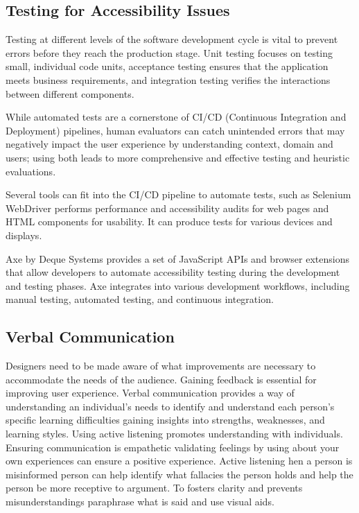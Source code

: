 \documentclass[main.tex]{subfiles}
\begin{document}
\subsection{Testing for Accessibility Issues}

Testing at different levels of the software development cycle is vital to prevent errors before they reach the production stage. Unit testing focuses on testing small, individual code units, acceptance testing ensures that the application meets business requirements, and integration testing verifies the interactions between different components. 

While automated tests are a cornerstone of CI/CD (Continuous Integration and Deployment) pipelines, human evaluators can catch unintended errors that may negatively impact the user experience by understanding context, domain and users; using both leads to more comprehensive and effective testing and heuristic evaluations.

Several tools can fit into the CI/CD pipeline to automate tests, such as Selenium WebDriver performs performance and accessibility audits for web pages and HTML components for usability. It can produce tests for various devices and displays.

Axe by Deque Systems provides a set of JavaScript APIs and browser extensions that allow developers to automate accessibility testing during the development and testing phases. Axe integrates into various development workflows, including manual testing, automated testing, and continuous integration. 


\subsection{Verbal Communication }


 Designers need to be made aware of what improvements are necessary to accommodate the needs of the audience. Gaining feedback is essential for improving user experience. Verbal communication provides a way of understanding an individual's needs to identify and understand each person's specific learning difficulties gaining insights into strengths, weaknesses, and learning styles. Using active listening promotes understanding with individuals. Ensuring communication is empathetic validating feelings by using about your own experiences can ensure a positive experience. Active listening hen a person is misinformed person can help identify what fallacies the person holds and help the person be more receptive to argument. To fosters clarity and prevents misunderstandings paraphrase what is said and use visual aids.
\end{document}

